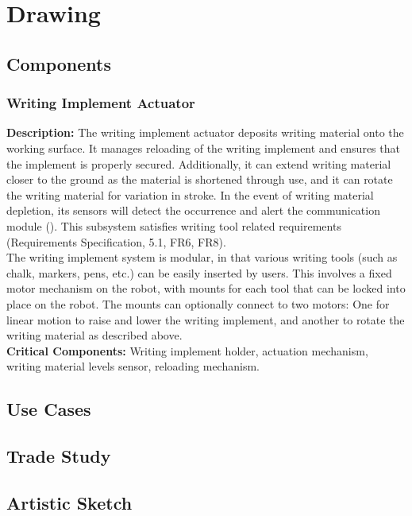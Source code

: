 
\section{Drawing}
\label{sec:drawing}

\subsection{Components}

\subsubsection{Writing Implement Actuator}
\label{sec:subsystem_writing_implement_actuator}
\textbf{Description:} The writing implement actuator deposits writing material onto the working surface. It manages reloading of the writing implement and ensures that the implement is properly secured. Additionally, it can extend writing material closer to the ground as the material is shortened through use, and it can rotate the writing material for variation in stroke. In the event of writing material depletion, its sensors will detect the occurrence and alert the communication module (). This subsystem satisfies writing tool related requirements (Requirements Specification, 5.1, FR6, FR8).\\
The writing implement system is modular, in that various writing tools (such as chalk, markers, pens, etc.) can be easily inserted by users. This involves a fixed motor mechanism on the robot, with mounts for each tool that can be locked into place on the robot. The mounts can optionally connect to two motors: One for linear motion to raise and lower the writing implement, and another to rotate the writing material as described above. \\
\textbf{Critical Components:} Writing implement holder, actuation mechanism, writing material levels sensor, reloading mechanism. \\

\subsection{Use Cases}

\subsection{Trade Study}

\subsection{Artistic Sketch}